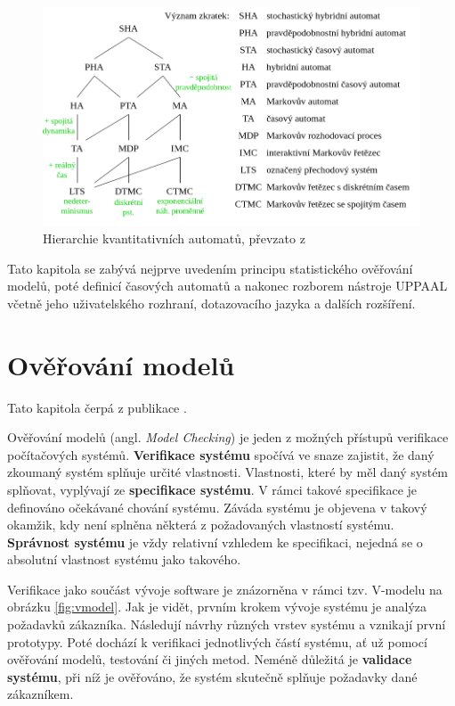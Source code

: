 \begin{figure}[H]
    \centering
    \includegraphics[width=\textwidth]{obrazky-figures/automata_zoo.png}
    \caption{Hierarchie kvantitativních automatů, převzato z \cite{automata_zoo}}
    \label{fig:automata_zoo}
\end{figure}

Tato kapitola se zabývá nejprve uvedením principu statistického ověřování modelů, poté definicí časových automatů a nakonec rozborem nástroje UPPAAL včetně jeho uživatelského rozhraní, dotazovacího jazyka a dalších rozšíření.

\pagebreak

\section{Ověřování modelů}
Tato kapitola čerpá z publikace \cite{mc_principles}.

Ověřování modelů (angl. \textit{Model Checking}) je jeden z možných přístupů verifikace počítačových systémů. \textbf{Verifikace systému} spočívá ve snaze zajistit, že daný zkoumaný systém splňuje určité vlastnosti. Vlastnosti, které by měl daný systém splňovat, vyplývají ze \textbf{specifikace systému}. V rámci takové specifikace je definováno očekávané chování systému. Záváda systému je objevena v takový okamžik, kdy není splněna některá z požadovaných vlastností systému. \textbf{Správnost systému} je vždy relativní vzhledem ke specifikaci, nejedná se o absolutní vlastnost systému jako takového.

Verifikace jako součást vývoje software je znázorněna v rámci tzv. V-modelu na obrázku \ref{fig:vmodel}. Jak je vidět, prvním krokem vývoje systému je analýza požadavků zákazníka. Následují návrhy různých vrstev systému a vznikají první prototypy. Poté dochází k verifikaci jednotlivých částí systému, ať už pomocí ověřování modelů, testování či jiných metod. Neméně důležitá je \textbf{validace systému}, při níž je ověřováno, že systém skutečně splňuje požadavky dané zákazníkem.


